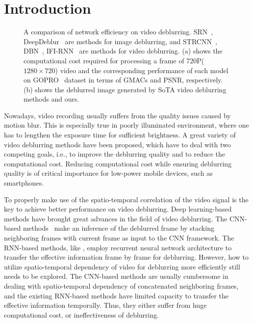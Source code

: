 \documentclass[twocolumn]{svjour3}          \smartqed  \usepackage{graphicx}
\begin{document}
\section{Introduction}
\label{sec:intro}

\begin{figure*}[!t]
	\centering
{}
	\hfil
	\caption{A comparison of network efficiency on video deblurring. SRN~\cite{tao2018scale}, DeepDeblur~\cite{nah2017deep} are methods for image deblurring, and STRCNN~\cite{hyun2017online}, DBN~\cite{su2017deep}, IFI-RNN~\cite{nah2019recurrent} are methods for video deblurring. (a) shows the computational cost required for processing a frame of 720P($1280\times720$) video and the corresponding performance of each model on GOPRO~\cite{nah2017deep} dataset in terms of GMACs and PSNR, respectively. (b) shows the deblurred image generated by SoTA video deblurring methods and ours.}
	\label{fig:efficiency}
\end{figure*}

Nowadays, video recording usually suffers from the quality issues caused by motion blur. This is especially true in poorly illuminated environment, where one has to lengthen the exposure time for sufficient brightness. A great variety of video deblurring methods have been proposed, which have to deal with two competing goals, i.e., to improve the deblurring quality and to reduce the computational cost. Reducing computational cost while ensuring deblurring quality is of critical importance for low-power mobile devices, such as smartphones.

To properly make use of the spatio-temporal correlation of the video signal is the key to achieve better performance on video deblurring. Deep learning-based methods have brought great advances in the field of video deblurring. The CNN-based methods~\cite{su2017deep,wang2019edvr} make an inference of the deblurred frame by stacking neighboring frames with current frame as input to the CNN framework. The RNN-based methods, like \cite{wieschollek2017learning,hyun2017online,zhou2019spatio,nah2019recurrent}, employ recurrent neural network architecture to transfer the effective information frame by frame for deblurring. However, how to utilize spatio-temporal dependency of video for deblurring more efficiently still needs to be explored. The CNN-based methods are usually cumbersome in dealing with spatio-temporal dependency of concatenated neighboring frames, and the existing RNN-based methods have limited capacity to transfer the effective information temporally. Thus, they either suffer from huge computational cost, or ineffectiveness of deblurring.
\end{document}
